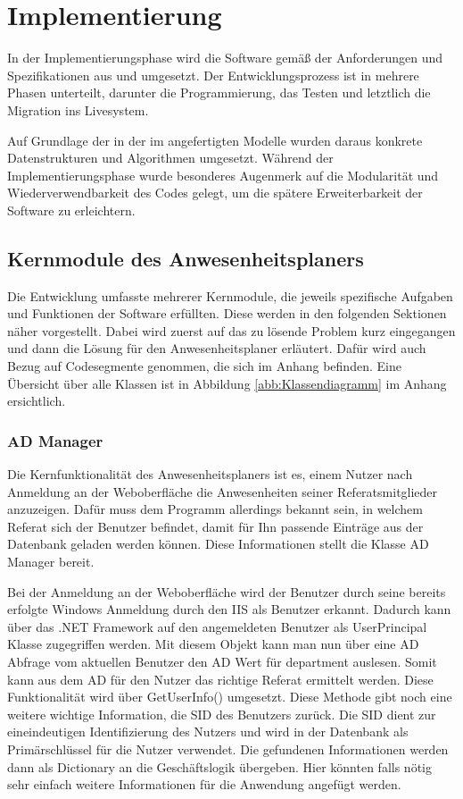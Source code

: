 \section{Implementierung}
\label{sec:Implementierung}
In der Implementierungsphase wird die Software gemäß der Anforderungen und Spezifikationen aus  und  umgesetzt. Der Entwicklungsprozess ist in mehrere Phasen unterteilt, darunter die Programmierung, das Testen und letztlich die Migration ins Livesystem.

Auf Grundlage der in der im  angefertigten Modelle wurden daraus konkrete Datenstrukturen und Algorithmen umgesetzt. Während der Implementierungsphase wurde besonderes Augenmerk auf die Modularität und Wiederverwendbarkeit des Codes gelegt, um die spätere Erweiterbarkeit der Software zu erleichtern.

\subsection{Kernmodule des Anwesenheitsplaners}
\label{sec:Kernmodule}
Die Entwicklung umfasste mehrerer Kernmodule, die jeweils spezifische Aufgaben und Funktionen der Software erfüllten. Diese werden in den folgenden Sektionen näher vorgestellt. Dabei wird zuerst auf das zu lösende Problem kurz eingegangen und dann die Lösung für den Anwesenheitsplaner erläutert. Dafür wird \ggfs auch Bezug auf Codesegmente genommen, die sich im Anhang befinden. Eine Übersicht über alle Klassen ist in Abbildung \ref{abb:Klassendiagramm} im Anhang ersichtlich.

\subsubsection{AD Manager}
\label{sec:ADManager}
Die Kernfunktionalität des Anwesenheitsplaners ist es, einem Nutzer nach Anmeldung an der Weboberfläche die Anwesenheiten seiner Referatsmitglieder anzuzeigen. Dafür muss dem Programm allerdings bekannt sein, in welchem Referat sich der Benutzer befindet, damit für Ihn passende Einträge aus der Datenbank geladen werden können. Diese Informationen stellt die Klasse AD Manager bereit.

Bei der Anmeldung an der Weboberfläche wird der Benutzer durch seine bereits erfolgte Windows Anmeldung durch den IIS als Benutzer erkannt. Dadurch kann über das .NET Framework auf den angemeldeten Benutzer als UserPrincipal Klasse zugegriffen werden. Mit diesem Objekt kann man nun über eine AD Abfrage vom aktuellen Benutzer den AD Wert für department auslesen. Somit kann aus dem AD für den Nutzer das richtige Referat ermittelt werden. Diese Funktionalität wird über GetUserInfo() umgesetzt. Diese Methode gibt noch eine weitere wichtige Information, die SID des Benutzers zurück. Die SID dient zur eineindeutigen Identifizierung des Nutzers und wird in der Datenbank als Primärschlüssel für die Nutzer verwendet. Die gefundenen Informationen werden dann als Dictionary an die Geschäftslogik übergeben. Hier könnten falls nötig sehr einfach weitere Informationen für die Anwendung angefügt werden.

